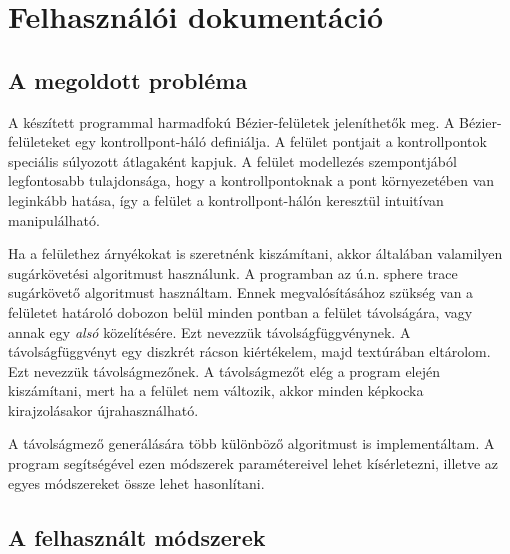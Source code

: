 \chapter{Felhasználói dokumentáció}
\label{ch:user}

\section{A megoldott probléma}

A készített programmal harmadfokú Bézier-felületek jeleníthetők meg. A Bézier-felületeket egy kontrollpont-háló definiálja. A felület pontjait a kontrollpontok speciális súlyozott átlagaként kapjuk. A felület modellezés szempontjából legfontosabb tulajdonsága, hogy a kontrollpontoknak a pont környezetében van leginkább hatása, így a felület a kontrollpont-hálón keresztül intuitívan manipulálható.

Ha a felülethez árnyékokat is szeretnénk kiszámítani, akkor általában valamilyen sugárkövetési algoritmust használunk. A programban az ú.n. sphere trace sugárkövető algoritmust használtam. Ennek megvalósításához szükség van a felületet határoló dobozon belül minden pontban a felület távolságára, vagy annak egy \emph{alsó} közelítésére. Ezt nevezzük távolságfüggvénynek. A távolságfüggvényt egy diszkrét rácson kiértékelem, majd textúrában eltárolom. Ezt nevezzük távolságmezőnek. A távolságmezőt elég a program elején kiszámítani, mert ha a felület nem változik, akkor minden képkocka kirajzolásakor újrahasználható.

A távolságmező generálására több különböző algoritmust is implementáltam. A program segítségével ezen módszerek paramétereivel lehet kísérletezni, illetve az egyes módszereket össze lehet hasonlítani.


\section{A felhasznált módszerek}


